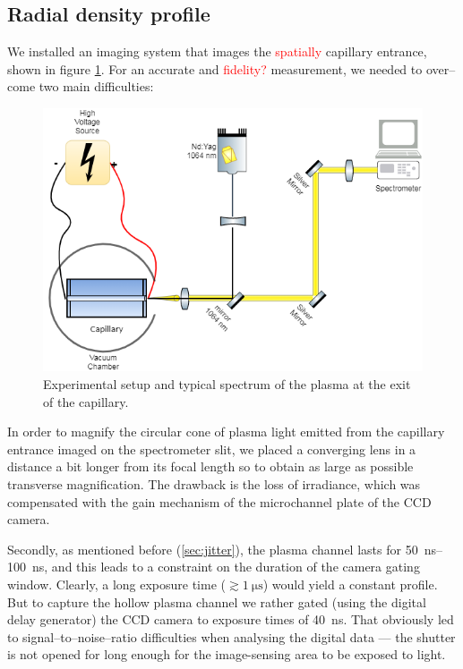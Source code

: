 \documentclass[justified,nofonts,nobib]{tufte-book}
\begin{document}
\subsection{Radial density profile}\label{ssec:radial}
We installed an imaging system that images the \textcolor{red}{spatially} capillary entrance, shown in figure \ref{fig:radial_system}. For an accurate and \textcolor{red}{fidelity?} measurement, we needed to over--come two main difficulties:

	\begin{figure}
	\centering
	    \includegraphics[width=\textwidth]{./figures/spectro/radial_system.png}
	    \caption{Experimental setup and typical spectrum of the plasma at the exit of the capillary.}
	    \label{fig:radial_system}
	\end{figure}

In order to magnify the circular cone of plasma light emitted from the capillary entrance imaged on the spectrometer slit, we placed a converging lens in a distance a bit longer from its focal length so to obtain as large as possible transverse magnification. The drawback is the loss of irradiance, which was compensated with the gain mechanism of the microchannel plate of the CCD camera.

Secondly, as mentioned before (\ref{sec:jitter}), the plasma channel lasts for \SIrange{50}{100}{\ns}, and this leads to a constraint on the duration of the camera gating window. Clearly, a long exposure time ($\gtrsim \SI{1}{\us}$) would yield a constant profile. But to capture the hollow plasma channel we rather gated (using the digital delay generator) the CCD camera to exposure times of \SI{40}{\ns}. That obviously led to signal--to--noise--ratio difficulties when analysing the digital data --- the shutter is not opened for long enough for the image-sensing area to be exposed to light.
\end{document}
